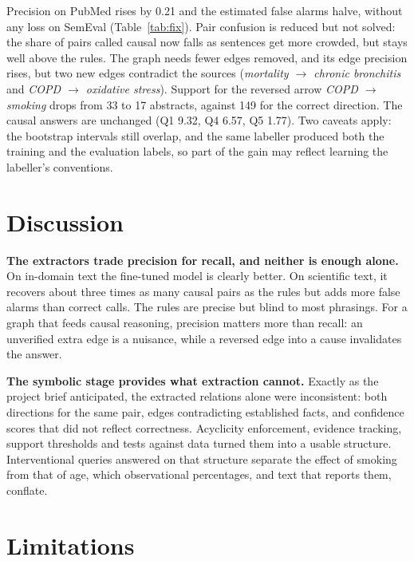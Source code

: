 \documentclass[11pt,a4paper]{article}
\begin{document}
Precision on PubMed rises by 0.21 and the estimated false alarms halve, without any loss on SemEval (Table~\ref{tab:fix}). Pair
confusion is reduced but not solved: the share of pairs called causal now falls as sentences get more crowded, but stays well above the
rules. The graph needs fewer edges removed, and its edge precision rises, but two new edges contradict the sources (\textit{mortality
$\rightarrow$ chronic bronchitis} and \textit{COPD $\rightarrow$ oxidative stress}). Support for the reversed arrow \textit{COPD
$\rightarrow$ smoking} drops from 33 to 17 abstracts, against 149 for the correct direction. The causal answers are unchanged (Q1 9.32,
Q4 6.57, Q5 1.77). Two caveats apply: the bootstrap intervals still overlap, and the same labeller produced both the training and the
evaluation labels, so part of the gain may reflect learning the labeller's conventions.

\section{Discussion}

\textbf{The extractors trade precision for recall, and neither is enough alone.} On in-domain text the fine-tuned model is clearly
better. On scientific text, it recovers about three times as many causal pairs as the rules but adds more false alarms than correct
calls. The rules are precise but blind to most phrasings. For a graph that feeds causal reasoning, precision matters more than recall:
an unverified extra edge is a nuisance, while a reversed edge into a cause invalidates the answer.

\textbf{The symbolic stage provides what extraction cannot.} Exactly as the project brief anticipated, the extracted relations alone
were inconsistent: both directions for the same pair, edges contradicting established facts, and confidence scores that did not reflect
correctness. Acyclicity enforcement, evidence tracking, support thresholds and tests against data turned them into a usable structure.
Interventional queries answered on that structure separate the effect of smoking from that of age, which observational percentages,
and text that reports them, conflate.

\section{Limitations}
\end{document}

